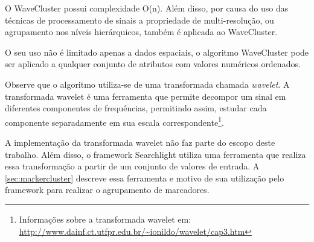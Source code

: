 O WaveCluster possui complexidade O(n). Além disso, por causa do uso das técnicas de processamento de sinais a propriedade de multi-resolução, ou agrupamento nos níveis hierárquicos, também é aplicada ao WaveCluster.

O seu uso não é limitado apenas a dados espaciais, o algoritmo WaveCluster pode ser aplicado a qualquer conjunto de atributos com valores numéricos ordenados.

Observe que o algoritmo utiliza-se de uma transformada chamada \textit{wavelet}. A transformada wavelet é uma ferramenta que permite decompor um sinal em diferentes componentes de frequências, permitindo assim, estudar cada componente separadamente em sua escala correspondente\footnote{ Informações sobre a transformada wavelet em: \url{http://www.dainf.ct.utfpr.edu.br/~ionildo/wavelet/cap3.htm}}. 

A implementação da transformada wavelet não faz parte do escopo deste trabalho. Além disso, o framework Searchlight utiliza uma ferramenta que realiza essa transformação a partir de um conjunto de valores de entrada. A \autoref{sec:markercluster} descreve essa ferramenta e motivo de sua utilização pelo framework para realizar o agrupamento de marcadores.
	